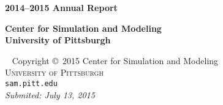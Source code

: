 \documentclass[11pt,fleqn,letterpaper]{book}
\begin{document}
\begingroup
\thispagestyle{empty}
\centering
\vspace*{-2.75cm}
\par\bfseries\fontsize{38}{38}\selectfont
\color{PittBlue}2014--2015 Annual Report\par %
\vspace{0.25em} 
{\Huge \bf Center for Simulation and Modeling\\University of Pittsburgh}\par
\endgroup


\newpage
~\vfill
\thispagestyle{empty}
\noindent Copyright \copyright\ 2015 Center for Simulation and Modeling\\ %
\textsc{University of Pittsburgh}\\ %
\texttt{sam.pitt.edu}\\ %

\noindent \textit{Submited: July 13, 2015}



\pagestyle{empty} %
\tableofcontents %
\cleardoublepage %
\pagestyle{fancy} %







% 



\cleardoublepage
{}
\setlength{\columnsep}{0.75cm}
\printindex

\end{document}
